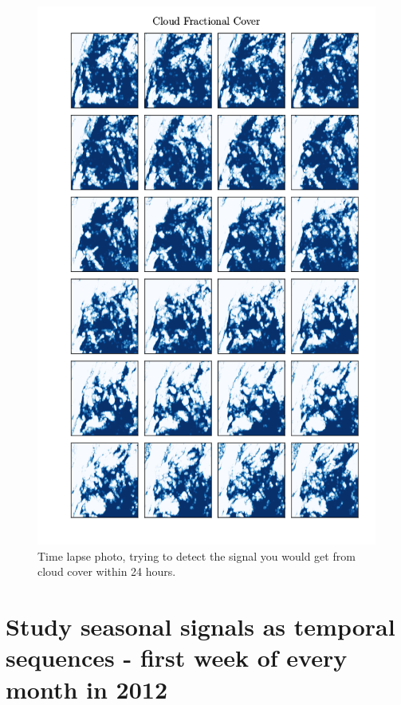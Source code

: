 \begin{figure}[ht]
    \centering
    \includegraphics[scale=0.7]{python_figs/timelapse_cloud_cover_24hrs_from_2010-07-01.png}
    \caption{Time lapse photo, trying to detect the signal you would get from cloud cover within 24 hours.}
    \label{fig:time_lapse}
\end{figure}



\chapter{Study seasonal signals as temporal sequences - first week of every month in 2012}

